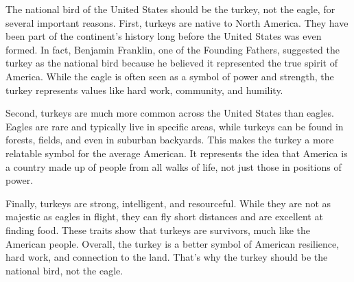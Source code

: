 \documentclass[12pt]{article}
\begin{document}
\begin{tcolorbox}[colframe=black!60, colback=white, 
coltitle=black, colbacktitle=black!15, fonttitle=\bfseries\Large, 
title=Text: America's National Bird, halign title=center, left=10pt, right=10pt, top=10pt, bottom=15pt]
The national bird of the United States should be the turkey, not the eagle, for several important reasons. First, turkeys are native to North America. They have been part of the continent’s history long before the United States was even formed. In fact, Benjamin Franklin, one of the Founding Fathers, suggested the turkey as the national bird because he believed it represented the true spirit of America. While the eagle is often seen as a symbol of power and strength, the turkey represents values like hard work, community, and humility.

Second, turkeys are much more common across the United States than eagles. Eagles are rare and typically live in specific areas, while turkeys can be found in forests, fields, and even in suburban backyards. This makes the turkey a more relatable symbol for the average American. It represents the idea that America is a country made up of people from all walks of life, not just those in positions of power.

Finally, turkeys are strong, intelligent, and resourceful. While they are not as majestic as eagles in flight, they can fly short distances and are excellent at finding food. These traits show that turkeys are survivors, much like the American people. Overall, the turkey is a better symbol of American resilience, hard work, and connection to the land. That’s why the turkey should be the national bird, not the eagle.

 
\end{tcolorbox}

\vspace{2cm}

\vspace{1em}
\end{document}
